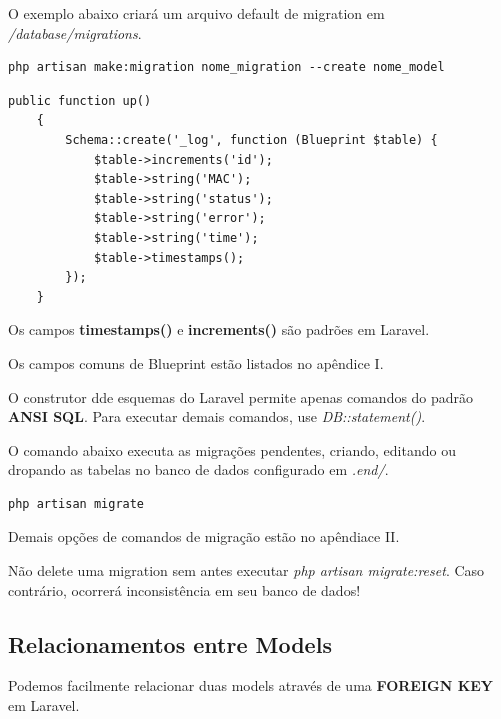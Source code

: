 \documentclass[
12pt,				%
openany,			%
twoside,			%
a4paper,			%
english,			%
french,				%
spanish,			%
brazil,				%
]{abntex2}
\begin{document}
O exemplo abaixo criará um arquivo default de migration em \textit{/database/migrations}.

\begin{lstlisting}[style=bash,caption={Criando uma migration}]
    php artisan make:migration nome_migration --create nome_model
\end{lstlisting}


\begin{lstlisting}[style=php,caption={Arquivo de migration exemplo}]
    public function up()
    {
        Schema::create('_log', function (Blueprint $table) {
            $table->increments('id');
            $table->string('MAC');
            $table->string('status');
            $table->string('error');
            $table->string('time');
            $table->timestamps();
        });
    }
\end{lstlisting}

Os campos \textbf{timestamps()} e \textbf{increments()} são padrões em Laravel.

Os campos comuns de Blueprint estão listados no apêndice I.

\begin{leftbar}
    O construtor dde esquemas do Laravel permite apenas comandos do padrão \textbf{ANSI SQL}. Para executar demais comandos, use \textit{DB::statement()}.
\end{leftbar}

O comando abaixo executa as migrações pendentes, criando, editando ou dropando as tabelas no banco de dados configurado em \textit{.end/}.

\begin{lstlisting}[style=bash,caption={Executando uma migração}]
    php artisan migrate
\end{lstlisting}

Demais opções de comandos de migração estão no apêndiace II.

\begin{leftbar}
    Não delete uma migration sem antes executar \textit{php artisan migrate:reset}. Caso contrário, ocorrerá inconsistência em seu banco de dados!
\end{leftbar}

\subsection{Relacionamentos entre Models}
Podemos facilmente relacionar duas models através de uma \textbf{FOREIGN KEY} em Laravel.
\end{document}
